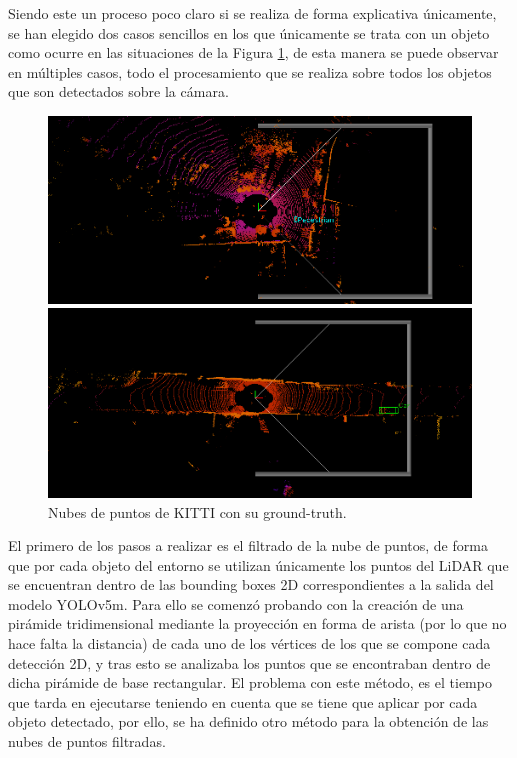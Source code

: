 Siendo este un proceso poco claro si se realiza de forma explicativa únicamente, se han elegido dos casos sencillos en los que únicamente se trata con un objeto como ocurre en las situaciones de la Figura \ref{fig:Nubes de puntos de KITTI con su ground-truth.}, de esta manera se puede observar en múltiples casos, todo el procesamiento que se realiza sobre todos los objetos que son detectados sobre la cámara.

\begin{figure}[H]
	\begin{minipage}{0.495\textwidth}
		\centering
		\includegraphics[width=1\linewidth]{Book/figures/7_roi/kitti_pcl_0.png}
	\end{minipage}\hfill
	\begin{minipage}{0.495\textwidth}
		\centering
		\includegraphics[width=1\linewidth]{Book/figures/7_roi/kitti_pcl_2.png}
	\end{minipage}
	\caption{Nubes de puntos de KITTI con su ground-truth.}
	\label{fig:Nubes de puntos de KITTI con su ground-truth.}
\end{figure}

El primero de los pasos a realizar es el filtrado de la nube de puntos, de forma que por cada objeto del entorno se utilizan únicamente los puntos del \ac{LiDAR} que se encuentran dentro de las bounding boxes 2D correspondientes a la salida del modelo YOLOv5m. Para ello se comenzó probando con la creación de una pirámide tridimensional mediante la proyección en forma de arista (por lo que no hace falta la distancia) de cada uno de los vértices de los que se compone cada detección 2D, y tras esto se analizaba los puntos que se encontraban dentro de dicha pirámide de base rectangular. El problema con este método, es el tiempo que tarda en ejecutarse teniendo en cuenta que se tiene que aplicar por cada objeto detectado, por ello, se ha definido otro método para la obtención de las nubes de puntos filtradas.

